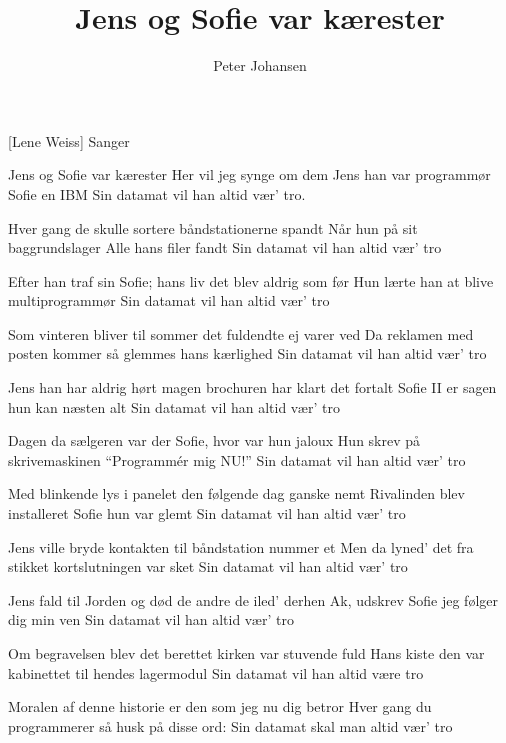 \documentclass[a4paper,11pt]{article}
\title{Jens og Sofie var kærester}
\author{Peter Johansen}
\begin{document}
\maketitle

\begin{roles}
[Lene Weiss] Sanger
\end{roles}

\begin{song}
Jens og Sofie var kærester
Her vil jeg synge om dem
Jens han var programmør
Sofie en IBM
Sin datamat
vil han altid vær' tro.

Hver gang de skulle sortere
båndstationerne spandt
Når hun på sit baggrundslager
Alle hans filer fandt
Sin datamat
vil han altid vær' tro

Efter han traf sin Sofie;
hans liv det blev aldrig som før
Hun lærte han at blive
multiprogrammør
Sin datamat
vil han altid vær' tro

Som vinteren bliver til sommer
det fuldendte ej varer ved
Da reklamen med posten kommer
så glemmes hans kærlighed
Sin datamat
vil han altid vær' tro

Jens han har aldrig hørt magen
brochuren har klart det fortalt
Sofie II er sagen
hun kan næsten alt
Sin datamat
vil han altid vær' tro

Dagen da sælgeren var der
Sofie, hvor var hun jaloux
Hun skrev på skrivemaskinen
"`Programmér mig NU!"'
Sin datamat
vil han altid vær' tro

Med blinkende lys i panelet
den følgende dag ganske nemt
Rivalinden blev installeret
Sofie hun var glemt
Sin datamat
vil han altid vær' tro

Jens ville bryde kontakten
til båndstation nummer et
Men da lyned' det fra stikket
kortslutningen var sket
Sin datamat
vil han altid vær' tro

Jens fald til Jorden og død
de andre de iled' derhen
Ak, udskrev Sofie
jeg følger dig min ven
Sin datamat
vil han altid vær' tro

Om begravelsen blev det berettet
kirken var stuvende fuld
Hans kiste den var kabinettet
til hendes lagermodul
Sin datamat
vil han altid være tro

Moralen af denne historie
er den som jeg nu dig betror
Hver gang du programmerer
så husk på disse ord:
Sin datamat
skal man altid vær' tro
\end{song}
\end{document}
